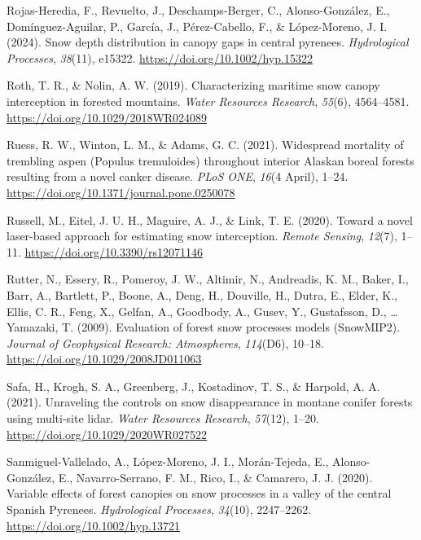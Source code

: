 \documentclass[
  letterpaper,
]{tex/uofsthesis-cs}
\newlength{\cslhangindent}
\newenvironment{CSLReferences}[2] %
 {\begin{list}{}{%
  \setlength{\itemindent}{0pt}
  \setlength{\leftmargin}{0pt}
  \setlength{\parsep}{0pt}
  \ifodd #1
   \setlength{\leftmargin}{\cslhangindent}
   \setlength{\itemindent}{-1\cslhangindent}
  \fi
  \setlength{\itemsep}{#2\baselineskip}}}
 {\end{list}}
\begin{document}
\begin{CSLReferences}{1}{0}
Rojas-Heredia, F., Revuelto, J., Deschamps-Berger, C., Alonso-González,
E., Domínguez-Aguilar, P., García, J., Pérez-Cabello, F., \&
López-Moreno, J. I. (2024). Snow depth distribution in canopy gaps in
central pyrenees. \emph{Hydrological Processes}, \emph{38}(11), e15322.
\url{https://doi.org/10.1002/hyp.15322}

Roth, T. R., \& Nolin, A. W. (2019). Characterizing maritime snow canopy
interception in forested mountains. \emph{Water Resources Research},
\emph{55}(6), 4564--4581. \url{https://doi.org/10.1029/2018WR024089}

Ruess, R. W., Winton, L. M., \& Adams, G. C. (2021). Widespread
mortality of trembling aspen ({Populus} tremuloides) throughout interior
{Alaskan} boreal forests resulting from a novel canker disease.
\emph{PLoS ONE}, \emph{16}(4 April), 1--24.
\url{https://doi.org/10.1371/journal.pone.0250078}

Russell, M., Eitel, J. U. H., Maguire, A. J., \& Link, T. E. (2020).
Toward a novel laser-based approach for estimating snow interception.
\emph{Remote Sensing}, \emph{12}(7), 1--11.
\url{https://doi.org/10.3390/rs12071146}

Rutter, N., Essery, R., Pomeroy, J. W., Altimir, N., Andreadis, K. M.,
Baker, I., Barr, A., Bartlett, P., Boone, A., Deng, H., Douville, H.,
Dutra, E., Elder, K., Ellis, C. R., Feng, X., Gelfan, A., Goodbody, A.,
Gusev, Y., Gustafsson, D., \ldots{} Yamazaki, T. (2009). Evaluation of
forest snow processes models ({SnowMIP2}). \emph{Journal of Geophysical
Research: Atmospheres}, \emph{114}(D6), 10--18.
\url{https://doi.org/10.1029/2008JD011063}

Safa, H., Krogh, S. A., Greenberg, J., Kostadinov, T. S., \& Harpold, A.
A. (2021). Unraveling the controls on snow disappearance in montane
conifer forests using multi-site lidar. \emph{Water Resources Research},
\emph{57}(12), 1--20. \url{https://doi.org/10.1029/2020WR027522}

Sanmiguel-Vallelado, A., López-Moreno, J. I., Morán-Tejeda, E.,
Alonso-González, E., Navarro-Serrano, F. M., Rico, I., \& Camarero, J.
J. (2020). Variable effects of forest canopies on snow processes in a
valley of the central {Spanish Pyrenees}. \emph{Hydrological Processes},
\emph{34}(10), 2247--2262. \url{https://doi.org/10.1002/hyp.13721}


\end{CSLReferences}
\end{document}
